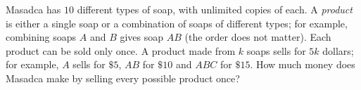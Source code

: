 Masadca has $10$ different types of soap, with unlimited copies of each. A \emph{product} is either a single soap or a combination of soaps of different types; for example, combining soaps $A$ and $B$ gives soap $AB$ (the order does not matter). Each product can be sold only once. A product made from $k$ soaps sells for $5k$ dollars; for example, $A$ sells for $\$5$, $AB$ for $\$10$ and $ABC$ for $\$15$. How much money does Masadca make by selling every possible product once?
